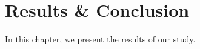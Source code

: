 
\chapter{Results \& Conclusion\label{ch:conclusion}}

In this chapter, we present the results of our study.





